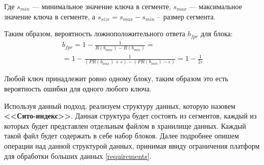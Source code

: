 Где $s_{min}$ --- минимальное значение ключа в сегменте, $s_{max}$ --- максимальное значение ключа в сегменте, а $s_{size} = s_{max} - s_{min}$ -- размер сегмента.

Таким образом, вероятность ложноположительного ответа $b_{fpr}$ для блока:
\begin{equation}\label{partition_fpr}
    \begin{gathered}
    b_{fpr} = 1 - \frac{1}{R(b_{max}) - R(b_{min})} =\\
    = 1 - \frac{1}{(PR(b_{max}) + \varepsilon) - (PR(b_{min}) - \varepsilon)} = 1 - \frac{1}{2\varepsilon}
    \end{gathered}
\end{equation}

Любой ключ принадлежит ровно одному блоку, таким образом это есть вероятность ошибки для одного любого ключа.

Используя данный подход, реализуем структуру данных, которую назовем \textbf{<<Сито-индекс>>}. Данная структура будет состоять из сегментов, каждый из которых будет представлен отдельным файлом в хранилище данных. Каждый такой файл будет содержать в себе набор блоков. Далее подробнее опишем операции над данной структурой данных, принимая ввиду ограничения платформ для обработки больших данных \ref{requirements}.

